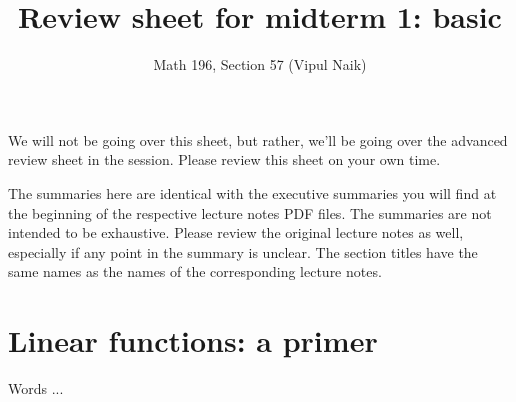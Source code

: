\documentclass[10pt]{amsart}
\title{Review sheet for midterm 1: basic}
\author{Math 196, Section 57 (Vipul Naik)}
\begin{document}
\maketitle

We will not be going over this sheet, but rather, we'll be going over
the advanced review sheet in the session. Please review this sheet on
your own time.

The summaries here are identical with the executive summaries you will
find at the beginning of the respective lecture notes PDF files. The
summaries are not intended to be exhaustive. Please review the
original lecture notes as well, especially if any point in the summary
is unclear. The section titles have the same names as the names of the
corresponding lecture notes.

\section{Linear functions: a primer}

Words ...
\end{document}
